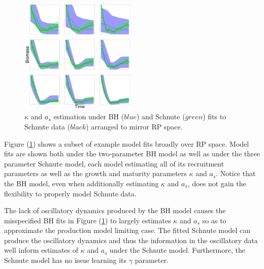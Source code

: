 \begin{figure}
\includegraphics[width=0.49\textwidth]{../ddBias/indexGridKAExpT45N300A0-1AS10K0.1.png}
\caption{
$\kappa$ and $a_s$ estimation under BH ($blue$) and Schnute ($green$) fits to
Schnute data ($black$) arranged to mirror RP space. %
}\label{estAK}
\end{figure}

%
Figure (\ref{estAK}) shows a subset of example model fits broadly over RP space.
Model fits are shown both under the two-parameter BH model as well as under the
three parameter Schnute model, each model estimating all of its recruitment
parameters as well as the growth and maturity parameters $\kappa$ and $a_s$.
Notice that the BH model, even when additionally estimating $\kappa$ and $a_s$,
does not gain the flexibility to properly model Schnute data.

%
The lack of oscillatory dynamics produced by the BH model causes the misspecified
BH fits in Figure (\ref{estAK}) to largely estimates $\kappa$ and $a_s$ so as to
approximate the production model limiting case. The fitted Schnute model can
produce the oscillatory dynamics and thus the information in the oscillatory data
well inform estimates of $\kappa$ and $a_s$ under the Schnute model. Furthermore,
the Schnute model has no issue learning its $\gamma$ parameter.

